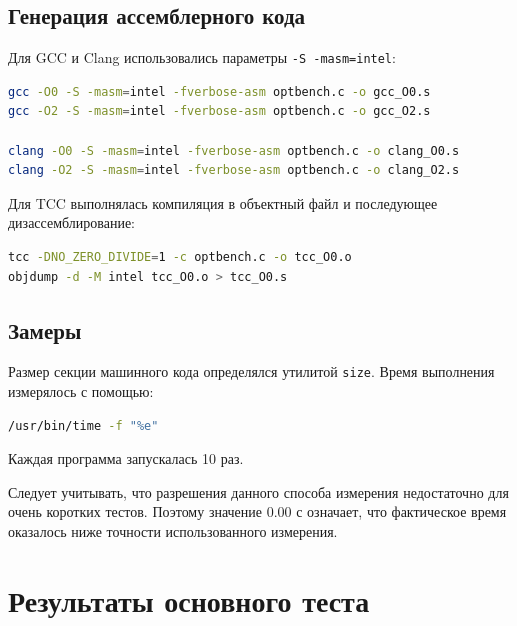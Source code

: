 \documentclass[12pt,a4paper]{article}
\begin{document}
\subsection{Генерация ассемблерного кода}

Для GCC и Clang использовались параметры \texttt{-S -masm=intel}:

\begin{lstlisting}[language=bash]
gcc -O0 -S -masm=intel -fverbose-asm optbench.c -o gcc_O0.s
gcc -O2 -S -masm=intel -fverbose-asm optbench.c -o gcc_O2.s

clang -O0 -S -masm=intel -fverbose-asm optbench.c -o clang_O0.s
clang -O2 -S -masm=intel -fverbose-asm optbench.c -o clang_O2.s
\end{lstlisting}

Для TCC выполнялась компиляция в объектный файл и последующее дизассемблирование:

\begin{lstlisting}[language=bash]
tcc -DNO_ZERO_DIVIDE=1 -c optbench.c -o tcc_O0.o
objdump -d -M intel tcc_O0.o > tcc_O0.s
\end{lstlisting}

\subsection{Замеры}

Размер секции машинного кода определялся утилитой \texttt{size}. Время выполнения измерялось с помощью:

\begin{lstlisting}[language=bash]
/usr/bin/time -f "%e"
\end{lstlisting}

Каждая программа запускалась 10 раз.

Следует учитывать, что разрешения данного способа измерения недостаточно для очень коротких тестов. Поэтому значение 0.00 с означает, что фактическое время оказалось ниже точности использованного измерения.

\section{Результаты основного теста}
\end{document}
